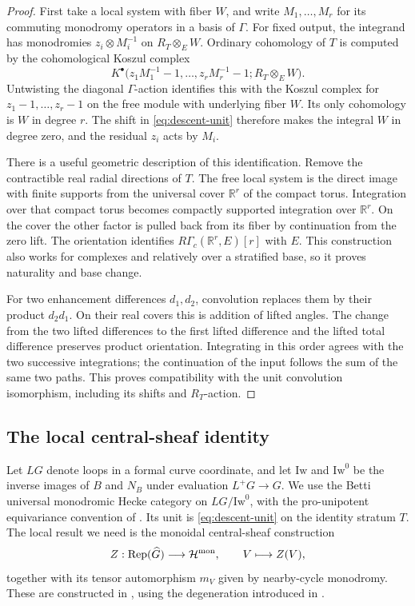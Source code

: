 \begin{proof}
First take a local system with fiber $W$, and write $M_1,\ldots,M_r$
for its commuting monodromy operators in a basis of $\Gamma$.
For fixed output, the integrand has monodromies
$z_i\otimes M_i^{-1}$ on $R_T\otimes_E W$.  Ordinary cohomology of
$T$ is computed by the cohomological Koszul complex
\[
 K^\bullet\bigl(z_1M_1^{-1}-1,\ldots,z_rM_r^{-1}-1;
                   R_T\otimes_E W\bigr).
\]
Untwisting the diagonal $\Gamma$-action identifies this with the
Koszul complex for $z_1-1,\ldots,z_r-1$ on the free module with
underlying fiber $W$.  Its only cohomology is $W$ in degree $r$.
The shift in \eqref{eq:descent-unit} therefore makes the integral $W$
in degree zero, and the residual $z_i$ acts by $M_i$.

There is a useful geometric description of this identification.
Remove the contractible real radial directions of $T$.  The free local
system is the direct image with finite supports from the universal
cover $\mathbb R^r$ of the compact torus.  Integration over that
compact torus becomes compactly supported integration over
$\mathbb R^r$.  On the cover the other factor is pulled back from its
fiber by continuation from the zero lift.  The orientation identifies
$R\Gamma_c(\mathbb R^r,E)[r]$ with $E$.
This construction also works for complexes and relatively over a
stratified base, so it proves naturality and base change.

For two enhancement differences $d_1,d_2$, convolution replaces them
by their product $d_2d_1$.  On their real covers this is addition of
lifted angles.  The change from the two lifted differences to the
first lifted difference and the lifted total difference preserves
product orientation.  Integrating in this order agrees with the two
successive integrations; the continuation of the input follows the
sum of the same two paths.  This proves compatibility with the unit
convolution isomorphism, including its shifts and $R_T$-action.
\end{proof}

\subsection{The local central-sheaf identity}

Let $LG$ denote loops in a formal curve coordinate, and let
$\mathrm{Iw}$ and $\mathrm{Iw}^0$ be the inverse images of $B$ and
$N_B$ under evaluation $L^+G\to G$.  We use the Betti universal
monodromic Hecke category on $LG/\mathrm{Iw}^0$, with the
pro-unipotent equivariance convention of \cite{DT}.  Its unit is
\eqref{eq:descent-unit} on the identity stratum $T$.
The local result we need is the monoidal central-sheaf construction
\[
 Z:\operatorname{Rep}(\widehat G)\longrightarrow\mathcal H^{\mathrm{mon}},
 \qquad V\longmapsto Z(V),
\]
together with its tensor automorphism $m_V$ given by nearby-cycle
monodromy.  These are constructed in \cite[Section~6, especially
Proposition~6.3.1]{DT}, using the degeneration introduced in
\cite{GaitsgoryCentral}.

